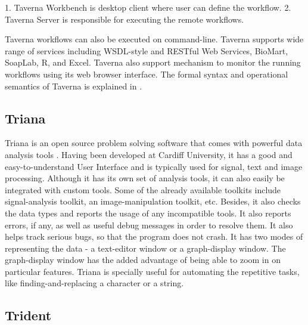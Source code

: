    1. Taverna Workbench is desktop client where user can define the
      workflow.
   2. Taverna Server is responsible for executing the remote
      workflows.

   Taverna workflows can also be executed on command-line.  Taverna
   supports wide range of services including WSDL-style and RESTful
   Web Services, BioMart, SoapLab, R, and Excel. Taverna also support
   mechanism to monitor the running workflows using its web browser
   interface. The formal syntax and operational semantics of Taverna
   is explained in \cite{taverna-paper}.

\pv

\subsection{Triana}

   Triana is an open source problem solving software that comes with 
   powerful data analysis tools \cite{trianaDocumentation-1}.
   Having been developed at Cardiff University, it has a good and
   easy-to-understand User Interface and is typically used for signal,
   text and image processing.  Although it has its own set of analysis
   tools, it can also easily be integrated with custom tools.  Some of
   the already available toolkits include signal-analysis toolkit, an
   image-manipulation toolkit, etc.  Besides, it also checks the data
   types and reports the usage of any incompatible tools.  It also
   reports errors, if any, as well as useful debug messages in order
   to resolve them.  It also helps track serious bugs, so that the
   program does not crash.  It has two modes of representing the
   data - a text-editor window or a graph-display window.  The
   graph-display window has the added advantage of being able to zoom
   in on particular features.  Triana is specially useful for
   automating the repetitive tasks, like finding-and-replacing a
   character or a string.
   
\subsection{Trident}

